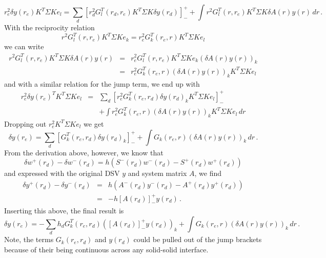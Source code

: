 \documentclass[11pt,a4paper]{article}
\begin{document}
\begin{equation}
r_e^2\delta y(r_e)K^T\Sigma K e_l = \sum_d\left[r_d^2G_l^T(r_d,r_e)K^T\Sigma K\delta y(r_d)\right]^+_-
+\int r^2G_l^T(r,r_e)K^T\Sigma K \delta A(r)y(r)\,dr \,.
\end{equation}
With the reciprocity relation
\begin{equation}
r^2G_l^T(r,r_e)K^T\Sigma K e_k=r_e^2 G_k^T(r_e,r)K^T\Sigma K e_l
\end{equation}
we can write
\begin{eqnarray}
r^2G_l^T(r,r_e)K^T\Sigma K\delta A(r)y(r) & = & r_e^2G_l^T(r,r_e)K^T\Sigma K e_k(\delta A(r) y(r))_k \nonumber \\
& = & r_e^2G_k^T(r_e,r)(\delta A(r) y(r))_k K^T\Sigma K e_l
\end{eqnarray}
and with a similar relation for the jump term, we end up with
\begin{eqnarray}
r_e^2\delta y(r_e)^T K^T\Sigma K e_l & = & \sum_d\left[r_e^2G_k^T(r_e,r_d)\delta y(r_d)_k K^T\Sigma K e_l\right]^+_- \nonumber \\
& & +\int r_e^2 G_k^T(r_e,r)(\delta A(r) y(r))_k K^T\Sigma K e_l\,dr
\end{eqnarray}
Dropping out $r_e^2 K^T\Sigma K e_l$ we get
\begin{equation}
\delta y(r_e) = \sum_d\left[G_k^T(r_e,r_d)\delta y(r_d)_k\right]^+_- +\int G_k(r_e,r)(\delta A(r) y(r))_k \,dr \,.
\end{equation}
From the derivation above, however, we know that
\begin{equation}
\delta w^+(r_d)-\delta w^-(r_d)=h(S^-(r_d)w^-(r_d)-S^+(r_d)w^+(r_d)) 
\end{equation}
and expressed with the original DSV $y$ and system matrix $A$, we find
\begin{eqnarray}
\delta y^+(r_d)-\delta y^-(r_d) & = & h(A^-(r_d)y^-(r_d)-A^+(r_d)y^+(r_d)) \nonumber \\
& = & -h\left[A(r_d)\right]^+_- y(r_d) \,.
\end{eqnarray}
Inserting this above, the final result is
\begin{equation}
\delta y(r_e) = -\sum_d h_d G_k^T(r_e,r_d)\left(\left[A(r_d)\right]^+_- y(r_d)\right)_k +\int G_k(r_e,r)(\delta A(r) y(r))_k \,dr \,.
\end{equation}
%
Note, the terms $G_k(r_e,r_d)$ and $y(r_d)$ could be pulled out of the jump brackets because of their being continuous across any solid-solid interface.
\end{document}
